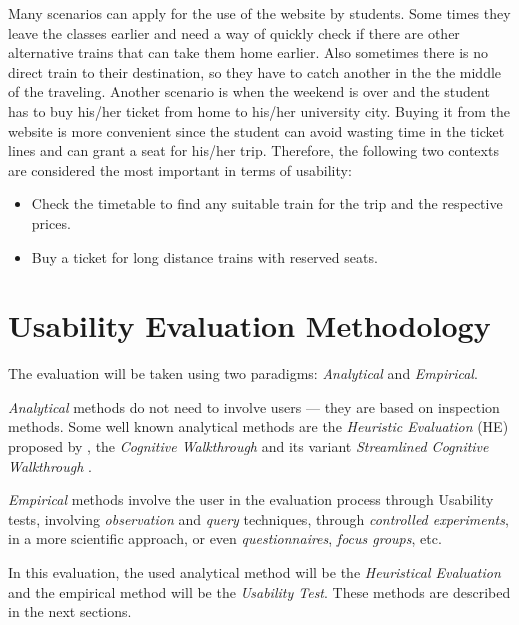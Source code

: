 \documentclass[a4paper]{article}
\begin{document}
Many scenarios can apply for the use of the website by students. Some times they leave the classes earlier and need a way of quickly check if there are other alternative trains that can take them home earlier. Also sometimes there is no direct train to their destination, so they have to catch another in the the middle of the traveling. Another scenario is when the weekend is over and the student has to buy his/her ticket from home to his/her university city. Buying it from the website is more convenient since the student can avoid wasting time in the ticket lines and can grant a seat for his/her trip. Therefore, the following two contexts are considered the most important in terms of usability:

\begin{itemize}
  \item Check the timetable to find any suitable train for the trip and the respective prices.
  \item Buy a ticket for long distance trains with reserved seats.
\end{itemize}

\section{Usability Evaluation Methodology}

The evaluation will be taken using two paradigms: \emph{Analytical} and \emph{Empirical}.

\emph{Analytical} methods do not need to involve users --- they are based on inspection methods. Some well known analytical methods are the \emph{Heuristic Evaluation} (HE) proposed by \citet{nielsen1990heuristic}, the \emph{Cognitive Walkthrough} \citep{wharton1994cognitive} and its variant \emph{Streamlined Cognitive Walkthrough} \citep{spencer2000streamlined}.

\emph{Empirical} methods involve the user in the evaluation process through Usability tests, involving \emph{observation} and \emph{query} techniques, through \emph{controlled experiments}, in a more scientific approach, or even \emph{questionnaires}, \emph{focus groups}, etc. 

In this evaluation, the used analytical method will be the \emph{Heuristical Evaluation} and the empirical method will be the \emph{Usability Test}. These methods are described in the next sections.



\end{document}
